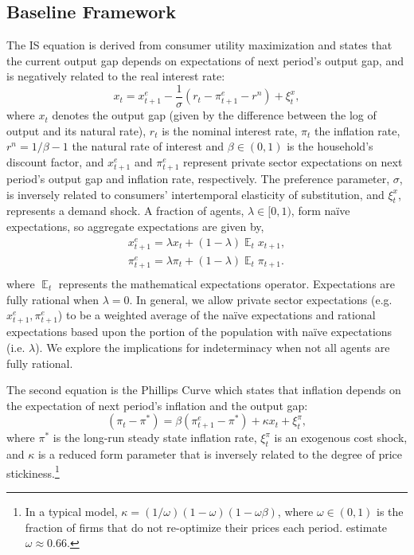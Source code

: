 \documentclass[english,authoryear,12pt]{elsarticle}
\DeclareMathOperator{\E}{\mathbb{E}}
\begin{document}
\subsection{Baseline Framework}

The IS equation is derived from consumer utility maximization and states that the current output gap depends on expectations of next period's output gap, and is negatively related to the real interest rate:
\begin{equation}\label{eq:ISe}
	x_t = x_{t+1}^e - \frac{1}{\sigma} \left( r_t - \pi_{t+1}^e  - r^n  \right) + \xi_t^{x},
\end{equation}
where $x_t$ denotes the output gap (given by the difference between the log of output and its natural rate), $r_t$ is the nominal interest rate, $\pi_t$ the inflation rate, $r^n = 1/\beta - 1$ the natural rate of interest and $\beta \in (0,1)$ is the household's discount factor, and $x_{t+1}^e$ and $\pi_{t+1}^e$ represent private sector expectations on next period's output gap and inflation rate, respectively. The preference parameter, $\sigma$, is inversely related to consumers' intertemporal elasticity of substitution, and $\xi_t^x$, represents a demand shock. A fraction of agents, $\lambda\in[0,1)$, form na\"ive expectations, so aggregate expectations are given by,
\begin{equation}
	\begin{array}{c}
		x_{t+1}^e = \lambda x_t + (1-\lambda) \E_t x_{t+1}, \\ [1.5pc]
		\pi_{t+1}^e = \lambda \pi_t + (1-\lambda) \E_t \pi_{t+1}. \\
	\end{array}
\end{equation}
where $\E_t$ represents the mathematical expectations operator. Expectations are fully rational when $\lambda=0$. In general, we allow private sector expectations (e.g. $x_{t+1}^e,\pi_{t+1}^e$) to be a  weighted average of the na\"ive expectations and rational expectations based upon the portion of the population with na\"ive expectations (i.e. $\lambda$). We explore the implications for indeterminacy when not all agents are fully rational.

The second equation is the Phillips Curve which states that inflation depends on the expectation of next period's inflation and the output gap:
\begin{equation}\label{eq:PhillipsCurvee}
	(\pi_t - \pi^*) = \beta (\pi_{t+1}^e - \pi^*) + \kappa x_t + \xi_t^{\pi},
\end{equation}
where $\pi^*$ is the long-run steady state inflation rate, $\xi_t^\pi$ is an exogenous cost shock, and $\kappa$ is a reduced form parameter that is inversely related to the degree of price stickiness.\footnote{In a typical model, $\kappa=(1/\omega)(1-\omega)(1-\omega\beta)$, where $\omega \in (0,1)$ is the fraction of firms that do not re-optimize their prices each period. \citet{smetswouters2007} estimate $\omega \approx 0.66$.}
\end{document}
